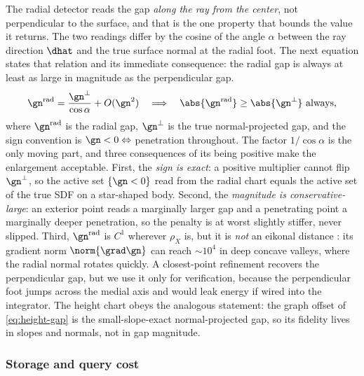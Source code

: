 The radial detector reads the gap \emph{along the ray from the center}, not perpendicular to the
surface, and that is the one property that bounds the value it returns. The two readings differ by the
cosine of the angle $\alpha$ between the ray direction $\dhat$ and the true surface normal at the radial
foot. The next equation states that relation and its immediate consequence: the radial gap is always at
least as large in magnitude as the perpendicular gap.
%
\begin{equation}
\gn^{\mathrm{rad}} = \frac{\gn^{\perp}}{\cos\alpha} + O(\gn^{2})
\quad\Longrightarrow\quad
\abs{\gn^{\mathrm{rad}}} \ge \abs{\gn^{\perp}}\ \text{always,}
\label{eq:disc:radbias}
\end{equation}
%
where $\gn^{\mathrm{rad}}$ is the radial gap, $\gn^{\perp}$ is the true normal-projected gap, and the
sign convention is $\gn<0\Leftrightarrow$ penetration throughout. The factor $1/\cos\alpha$ is the only
moving part, and three consequences of its being positive make the enlargement acceptable. First, the
\emph{sign is exact}: a positive multiplier cannot flip $\gn^{\perp}$, so the active set $\{\gn<0\}$ read
from the radial chart equals the active set of the true SDF on a star-shaped body. Second, the
\emph{magnitude is conservative-large}: an exterior point reads a marginally larger gap and a penetrating
point a marginally deeper penetration, so the penalty is at worst slightly stiffer, never slipped.
Third, $\gn^{\mathrm{rad}}$ is $C^{1}$ wherever $\rho_X$ is, but it is \emph{not} an eikonal distance
\citep{kolev2003level,liu2020implicit}: its gradient norm $\norm{\grad\gn}$ can reach $\sim 10^{4}$ in
deep concave valleys, where the radial normal rotates quickly. A closest-point refinement recovers the
perpendicular gap, but we use it only for verification, because the perpendicular foot jumps across the
medial axis and would leak energy if wired into the integrator. The height chart obeys the analogous
statement: the graph offset of \eqref{eq:height-gap} is the small-slope-exact normal-projected gap, so
its fidelity lives in slopes and normals, not in gap magnitude.

\subsubsection{Storage and query cost}

